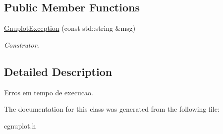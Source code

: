 \subsection*{Public Member Functions}
\begin{DoxyCompactItemize}
\item 
\hypertarget{classGnuplotException_a8b324a9ef4d3f75079d41ecd61c62d44}{\hyperlink{classGnuplotException_a8b324a9ef4d3f75079d41ecd61c62d44}{Gnuplot\-Exception} (const std\-::string \&msg)}\label{classGnuplotException_a8b324a9ef4d3f75079d41ecd61c62d44}

\begin{DoxyCompactList}\small\item\em Construtor. \end{DoxyCompactList}\end{DoxyCompactItemize}


\subsection{Detailed Description}
Erros em tempo de execucao. 

The documentation for this class was generated from the following file\-:\begin{DoxyCompactItemize}
\item 
cgnuplot.\-h\end{DoxyCompactItemize}
